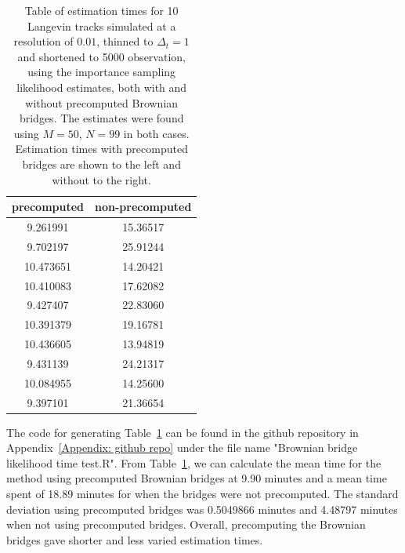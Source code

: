 \begin{table}[H]
    \centering
    \begin{tabular}{c|c}
        precomputed & non-precomputed \\
        \hline
        9.261991 & 15.36517 \\
        9.702197 & 25.91244 \\
        10.473651 & 14.20421 \\
        10.410083 & 17.62082 \\
        9.427407 & 22.83060 \\
        10.391379 & 19.16781 \\
        10.436605 & 13.94819 \\
        9.431139 & 24.21317 \\
        10.084955 & 14.25600 \\
        9.397101  & 21.36654 \\
    \end{tabular}
    \caption[table of estimation times in minutes, with and without precomputation of Brownian bridges]{Table of estimation times for 10 Langevin tracks simulated at a resolution of $0.01$, thinned to $\Delta_t = 1$ and shortened to 5000 observation, using the importance sampling likelihood estimates, both with and without precomputed Brownian bridges. The estimates were found using $M=50$, $N = 99$ in both cases. Estimation times with precomputed bridges are shown to the left and without to the right.}
    \label{tab: times}
\end{table}


The code for generating Table~\ref{tab: times} can be found in the github repository in Appendix~\ref{Appendix: github repo} under the file name "Brownian bridge likelihood time test.R". From Table~\ref{tab: times}, we can calculate the mean time for the method using precomputed Brownian bridges at 9.90 minutes and a mean time spent of 18.89 minutes for when the bridges were not precomputed. The standard deviation using precomputed bridges was 0.5049866 minutes and 4.48797 minutes when not using precomputed bridges. Overall, precomputing the Brownian bridges gave shorter and less varied estimation times.



